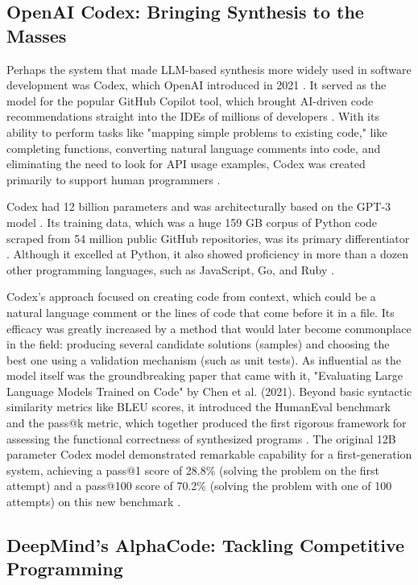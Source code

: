 \documentclass[12pt, a4paper]{report}
\begin{document}
\subsection{OpenAI Codex: Bringing Synthesis to the Masses}

Perhaps the system that made LLM-based synthesis more widely used in software development was Codex, which OpenAI introduced in 2021 \citep{chen2021evaluating}. It served as the model for the popular GitHub Copilot tool, which brought AI-driven code recommendations straight into the IDEs of millions of developers \citep{gulwani2017program}. With its ability to perform tasks like "mapping simple problems to existing code," like completing functions, converting natural language comments into code, and eliminating the need to look for API usage examples, Codex was created primarily to support human programmers \citep{chen2021evaluating}.

Codex had 12 billion parameters and was architecturally based on the GPT-3 model \citep{chen2021evaluating}. Its training data, which was a huge 159 GB corpus of Python code scraped from 54 million public GitHub repositories, was its primary differentiator \citep{chen2021evaluating}. Although it excelled at Python, it also showed proficiency in more than a dozen other programming languages, such as JavaScript, Go, and Ruby \citep{chen2021evaluating}.

Codex's approach focused on creating code from context, which could be a natural language comment or the lines of code that come before it in a file. Its efficacy was greatly increased by a method that would later become commonplace in the field: producing several candidate solutions (samples) and choosing the best one using a validation mechanism (such as unit tests). As influential as the model itself was the groundbreaking paper that came with it, "Evaluating Large Language Models Trained on Code" by Chen et al. (2021). Beyond basic syntactic similarity metrics like BLEU scores, it introduced the HumanEval benchmark and the pass@k metric, which together produced the first rigorous framework for assessing the functional correctness of synthesized programs \citep{chen2021evaluating}. The original 12B parameter Codex model demonstrated remarkable capability for a first-generation system, achieving a pass@1 score of 28.8\% (solving the problem on the first attempt) and a pass@100 score of 70.2\% (solving the problem with one of 100 attempts) on this new benchmark \citep{chen2021evaluating}.

\subsection{DeepMind's AlphaCode: Tackling Competitive Programming}
\end{document}
